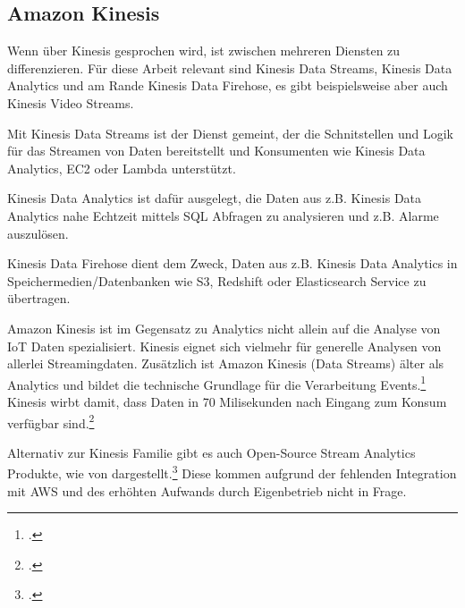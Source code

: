 

\subsection{Amazon Kinesis}


Wenn über Kinesis gesprochen wird, ist zwischen mehreren Diensten zu differenzieren. Für diese Arbeit relevant sind Kinesis Data Streams, Kinesis Data Analytics und am Rande Kinesis Data Firehose, es gibt beispielsweise aber auch Kinesis Video Streams.

Mit Kinesis Data Streams ist der Dienst gemeint, der die Schnitstellen und Logik für das Streamen von Daten bereitstellt und Konsumenten wie Kinesis Data Analytics, \ac{EC2} oder Lambda unterstützt. 

Kinesis Data Analytics ist dafür ausgelegt, die Daten aus z.B. Kinesis Data Analytics nahe Echtzeit mittels \ac{SQL} Abfragen zu analysieren und z.B. Alarme auszulösen.

Kinesis Data Firehose dient dem Zweck, Daten aus z.B. Kinesis Data Analytics in Speichermedien/Datenbanken wie \ac{S3}, Redshift oder Elasticsearch Service zu übertragen.

Amazon Kinesis ist im Gegensatz zu \AWSIOT Analytics nicht allein auf die Analyse von \ac{IoT} Daten spezialisiert. Kinesis eignet sich vielmehr für generelle Analysen von allerlei Streamingdaten. Zusätzlich ist Amazon Kinesis (Data Streams) älter als \AWSIOT Analytics und bildet die technische Grundlage für die Verarbeitung \AWSIOT Events.\footcite[Vgl.][]{Pogosova.28.05.2020} Kinesis wirbt damit, dass Daten in 70 Milisekunden nach Eingang zum Konsum verfügbar sind.\footcite[Vgl.][]{AmazonWebServicesInc..o.J.af}

Alternativ zur Kinesis Familie gibt es auch Open-Source Stream Analytics Produkte, wie von \citeauthor{Singh.2016} dargestellt.\footcite[Vgl.][]{Singh.2016} Diese kommen aufgrund der fehlenden Integration mit \ac{AWS} und des erhöhten Aufwands durch Eigenbetrieb nicht in Frage.

